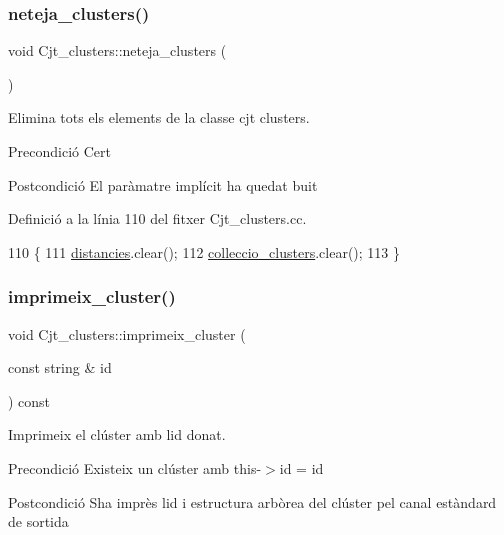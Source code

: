 \subsubsection{\texorpdfstring{neteja\+\_\+clusters()}{neteja\_clusters()}}
{\footnotesize\ttfamily void Cjt\+\_\+clusters\+::neteja\+\_\+clusters (\begin{DoxyParamCaption}{ }\end{DoxyParamCaption})}



Elimina tots els elements de la classe cjt clusters. 

\begin{DoxyPrecond}{Precondició}
Cert 
\end{DoxyPrecond}
\begin{DoxyPostcond}{Postcondició}
El paràmatre implícit ha quedat buit 
\end{DoxyPostcond}


Definició a la línia 110 del fitxer Cjt\+\_\+clusters.\+cc.


\begin{DoxyCode}
110                                   \{
111     \hyperlink{class_cjt__clusters_a8e94e53830e3224d791dcf7dbd0a6082}{distancies}.clear();
112     \hyperlink{class_cjt__clusters_aea7d6362517dd16cbd12736a3da50021}{colleccio\_clusters}.clear();
113 \}
\end{DoxyCode}
\mbox{\label{class_cjt__clusters_a732366a2fd16153e162fd838d25b5a56}} 
\subsubsection{\texorpdfstring{imprimeix\+\_\+cluster()}{imprimeix\_cluster()}}
{\footnotesize\ttfamily void Cjt\+\_\+clusters\+::imprimeix\+\_\+cluster (\begin{DoxyParamCaption}\item[{const string \&}]{id }\end{DoxyParamCaption}) const}



Imprimeix el clúster amb l\textquotesingle{}id donat. 

\begin{DoxyPrecond}{Precondició}
Existeix un clúster amb this-\/$>$id = id 
\end{DoxyPrecond}
\begin{DoxyPostcond}{Postcondició}
S\textquotesingle{}ha imprès l\textquotesingle{}id i estructura arbòrea del clúster pel canal estàndard de sortida 
\end{DoxyPostcond}


